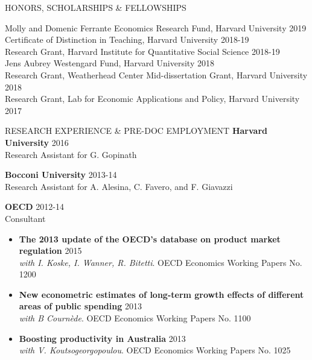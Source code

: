 \documentclass{resume} %
\begin{document}
\begin{rSection}{HONORS, SCHOLARSHIPS \& FELLOWSHIPS} 

Molly and Domenic Ferrante Economics Research Fund, Harvard University \hfill 2019 \\
Certificate of Distinction in Teaching, Harvard University \hfill 2018-19 \\
Research Grant, Harvard Institute for Quantitative Social Science \hfill 2018-19 \\
Jens Aubrey Westengard Fund, Harvard University \hfill 2018 \\
Research Grant, Weatherhead Center Mid-dissertation Grant, Harvard University \hfill 2018 \\
Research Grant, Lab for Economic Applications and Policy, Harvard University \hfill 2017 \\

\end{rSection}


\begin{rSection}{RESEARCH EXPERIENCE \& PRE-DOC EMPLOYMENT}
	{\textbf{Harvard University}}  \hfill 2016\\
	Research Assistant for G. Gopinath
	
	{\textbf{Bocconi University}} \hfill 2013-14 \\
	Research Assistant for A. Alesina, C. Favero, and F. Giavazzi 

	{\textbf{OECD}} \hfill 2012-14 \\
	Consultant
	\begin{itemize}[leftmargin=*]
		\vspace{-.5em}
		\setlength\itemsep{-.5em}
		\renewcommand\labelitemi{$\cdot$}
		\item \textbf{The 2013 update of the OECD's database on product market regulation} \hfill 2015 \\ \textit{with I. Koske, I. Wanner, R. Bitetti}. OECD Economics Working Papers No. 1200
		\item \textbf{New econometric estimates of long-term growth effects of different areas of public spending} \hfill 2013 \\ \textit{with B Cournède}. OECD Economics Working Papers No. 1100
		\item \textbf{Boosting productivity in Australia} \hfill 2013 \\ \textit{with V. Koutsogeorgopoulou}. OECD Economics Working Papers No. 1025
	\end{itemize}
	
\end{rSection}
\end{document}
